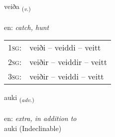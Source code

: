\documentclass[frontgrid, backgrid]{flacards}\usepackage[]{graphicx}\usepackage[]{color}
\begin{document}
\renewcommand{\flhead}{\vskip5pt \fboxsep=0pt {\small\bfseries\footnotesize Sagnorð | Verb}}
\renewcommand{\fcfoot}{\vskip5pt \fboxsep=0pt \hspace{2pt}{\small\bfseries\footnotesize 2K}}

\renewcommand{\blhead}{\vskip5pt {\small\bfseries\footnotesize Sagnorð | Verb }}
\renewcommand{\bcfoot}{\vskip5pt \hspace{2pt}{\small\bfseries\footnotesize 2K}}


{veiða \small{\textsubscript{(\textit{v.})}} \\[1ex] %
\textphonetic{[veiːða]} \\
en: \emph{catch, hunt} \\  [2ex]
\renewcommand*{\arraystretch}{0.8}
\begin{tabular}{p{1cm}l}
\textsc{1sg}: & veiði -- veiddi -- veitt \\ 
\textsc{2sg}: & veiðir -- veiddir -- veitt \\ 
\textsc{3sg}: & veiðir -- veiddi -- veitt \\ 
\end{tabular}
}


\renewcommand{\flhead}{\vskip5pt \fboxsep=0pt {\small\bfseries\footnotesize Atviksorð | Adverb}}
\renewcommand{\fcfoot}{\vskip5pt \fboxsep=0pt \hspace{2pt}{\small\bfseries\footnotesize 2K}}

\renewcommand{\blhead}{\vskip5pt {\small\bfseries\footnotesize Atviksorð | Adverb }}
\renewcommand{\bcfoot}{\vskip5pt \hspace{2pt}{\small\bfseries\footnotesize 2K}}


{auki \small{\textsubscript{(\textit{adv.})}} \\[1ex]
\textphonetic{[œiːcɪ]} \\
en: \emph{extra, in addition to} \\  [2ex]
auki (Indeclinable)}

\renewcommand{\flhead}{\vskip5pt \fboxsep=0pt {\small\bfseries\footnotesize Lýsingarorð | Adjective}}
\renewcommand{\fcfoot}{\vskip5pt \fboxsep=0pt \hspace{2pt}{\small\bfseries\footnotesize 2K}}
\end{document}
